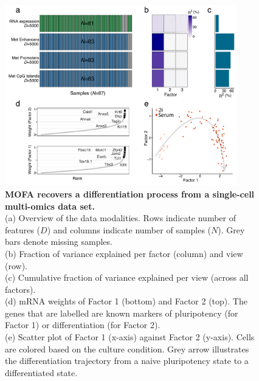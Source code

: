 \begin{figure}[H]
	\centering 	
	\includegraphics[width=0.9\textwidth]{MOFA_scMT}
	\caption{\textbf{MOFA recovers a differentiation process from a single-cell multi-omics data set.} \\
	(a) Overview of the data modalities. Rows indicate number of features ($D$) and columns indicate number of samples ($N$). Grey bars denote missing samples.\\
	(b) Fraction of variance explained per factor (column) and view (row).\\
	(c) Cumulative fraction of variance explained per view (across all factors).\\
	(d) mRNA weights of Factor 1 (bottom) and Factor 2 (top). The genes that are labelled are known markers of pluripotency (for Factor 1) or differentiation (for Factor 2). \\
	(e) Scatter plot of Factor 1 (x-axis) against Factor 2 (y-axis). Cells are colored based on the culture condition. Grey arrow illustrates the differentiation trajectory from a naive pluripotency state to a differentiated state. 
	}
	\label{fig:mofa_scMT}
\end{figure}



